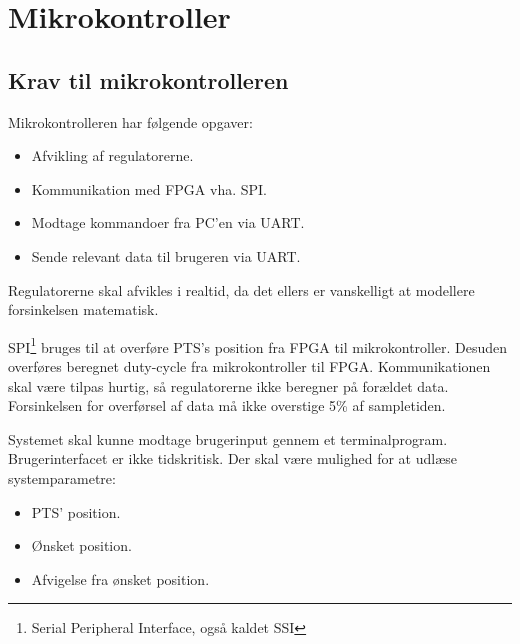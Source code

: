 \section{Mikrokontroller}
\label{sec:mikrokontroller}
\subsection{Krav til mikrokontrolleren}
Mikrokontrolleren har følgende opgaver: 
\begin{itemize}
	\item Afvikling af regulatorerne.
	\item Kommunikation med FPGA vha. SPI.
	\item Modtage kommandoer fra PC'en via UART.
	\item Sende relevant data til brugeren via UART.
\end{itemize}

Regulatorerne skal afvikles i realtid, da det ellers er vanskelligt at modellere forsinkelsen matematisk.


SPI\footnote{Serial Peripheral Interface, også kaldet SSI} bruges til at overføre PTS's position fra FPGA til mikrokontroller. Desuden overføres beregnet duty-cycle fra mikrokontroller til FPGA. Kommunikationen skal være tilpas hurtig, så regulatorerne ikke beregner på forældet data. Forsinkelsen for overførsel af data må ikke overstige 5\% af sampletiden. 

Systemet skal kunne modtage brugerinput gennem et terminalprogram. Brugerinterfacet er ikke tidskritisk. Der skal være mulighed for at udlæse systemparametre:

\begin{itemize}
	\item PTS' position. 
	\item Ønsket position. 
	\item Afvigelse fra ønsket position. 
\end{itemize}


